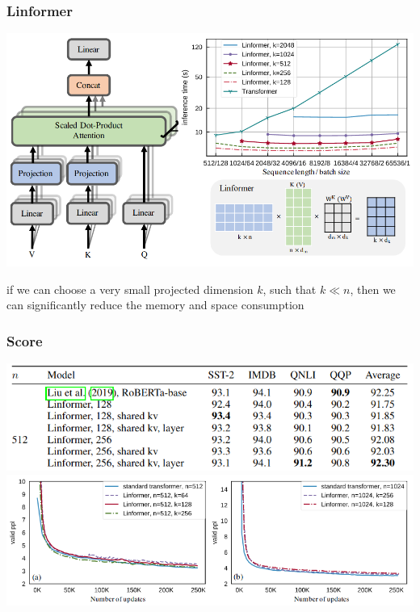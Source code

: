 \documentclass{beamer}
\begin{document}
\begin{frame}
    \frametitle{Linformer}
    \begin{center}
        \includegraphics[scale=0.28]{img/linformer.png}
    \end{center}
    \footnotesize{if we can choose a very small projected dimension $k$, such that $k \ll n$, then we can significantly reduce the memory and space consumption}
\end{frame}

\begin{frame}
    \frametitle{Score}
    \begin{center}
        \includegraphics[scale=0.42]{img/linformer_seq_len_512_score.png}
        \includegraphics[scale=0.35]{img/linformer_seq_len_512_perplexity.png}
    \end{center}
\end{frame}
\end{document}
